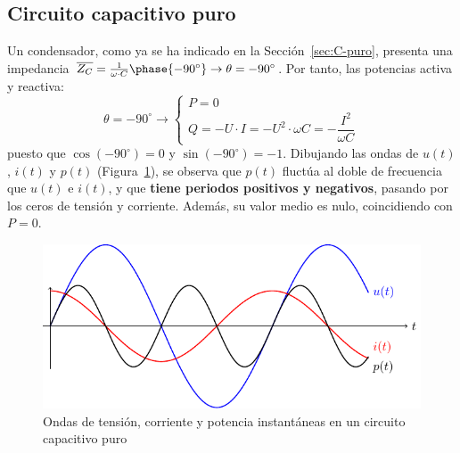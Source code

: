\subsection{Circuito capacitivo puro}\label{sec:potencia_C}
Un condensador, como ya se ha indicado en la Sección~\ref{sec:C-puro},
presenta una impedancia
$\overline{Z_C}=\frac{1}{\omega\cdot C}\phase{-90^\circ}\rightarrow
\theta=-90^\circ$. Por tanto, las potencias activa y reactiva:
\begin{equation}
  \theta = -90^\circ \rightarrow
  \boxed{\begin{cases}
    P = 0\\
    Q = -U\cdot I = -U^2\cdot \omega C = -\dfrac{I^2}{\omega C}
  \end{cases}}
\end{equation}
puesto que $\cos(-90^\circ)=0$ y $\sin(-90^\circ)=-1$. Dibujando las
ondas de $u(t)$, $i(t)$ y $p(t)$
(Figura~\ref{fig:capacitivoPotencia}), se observa que $p(t)$ fluctúa
al doble de frecuencia que $u(t)$ e $i(t)$, y que \textbf{tiene
  periodos positivos y negativos}, pasando por los ceros de tensión y
corriente. Además, su valor medio es nulo, coincidiendo con $P=0$.
\begin{figure}[H]
  \centering \includegraphics{../figs/capacitivoPuroPotencia.pdf}
  \caption{Ondas de tensión, corriente y potencia instantáneas en un
    circuito capacitivo puro}
  \label{fig:capacitivoPotencia}
\end{figure}
	
